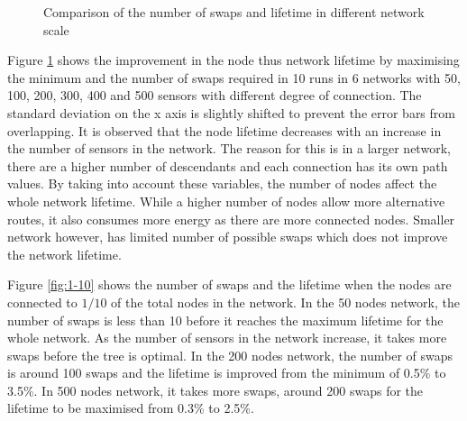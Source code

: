 \begin{figure}
\centering
\caption{Comparison of the number of swaps and lifetime in different network scale}
\label{fig:maxmin}
\end{figure}


Figure \ref{fig:maxmin} shows the improvement in the node thus network lifetime by maximising the minimum and the number of swaps required in 10 runs in 6 networks with 50, 100, 200, 300, 400 and 500 sensors with different degree of connection. 
The standard deviation on the x axis is slightly shifted to prevent the error bars from overlapping.
It is observed that the node lifetime decreases with an increase in the number of sensors in the network. The reason for this is in a larger network, there are a higher number of descendants and each connection has its own path values. By taking into account these variables, the number of nodes affect the whole network lifetime. While a higher number of nodes allow more alternative routes, it also consumes more energy as there are more connected nodes. Smaller network however, has limited number of possible swaps which does not improve the network lifetime.

Figure \ref{fig:1-10} shows the number of swaps and the lifetime when the nodes are connected to $1/10$ of the total nodes in the network. 
In the 50 nodes network, the number of swaps is less than 10 before it reaches the maximum lifetime for the whole network. 
As the number of sensors in the network increase, it takes more swaps before the tree is optimal. 
In the 200 nodes network, the number of swaps is around 100 swaps and the lifetime is improved from the minimum of 0.5\% to 3.5\%. In 500 nodes network, it takes more swaps, around 200 swaps for the lifetime to be maximised from 0.3\% to 2.5\%. 

